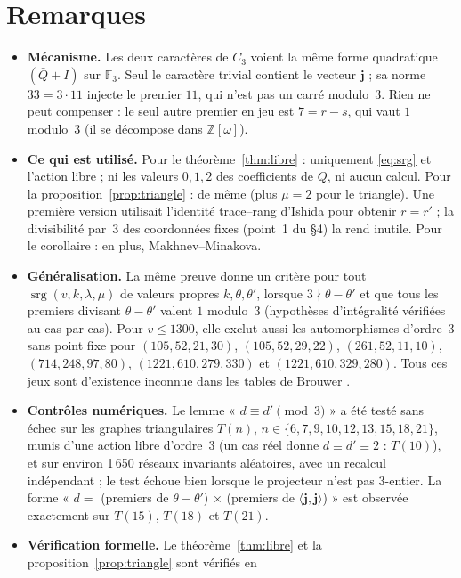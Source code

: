 \documentclass[11pt,a4paper]{article}
\theoremstyle{remark}
\newcommand{\Z}{\mathbb{Z}}
\newcommand{\F}{\mathbb{F}}
\newcommand{\one}{\mathbf{j}}
\newcommand{\srg}{\operatorname{srg}}
\begin{document}
\section{Remarques}

\begin{itemize}[leftmargin=*]
\item \textbf{Mécanisme.} Les deux caractères de $C_3$ voient la même forme quadratique $(\bar Q+I)$ sur $\F_3$. Seul le
caractère trivial contient le vecteur $\one$ ; sa norme $33=3\cdot11$ injecte le premier $11$, qui n'est pas un carré modulo~3.
Rien ne peut compenser : le seul autre premier en jeu est $7=r-s$, qui vaut $1$ modulo~3 (il se décompose dans $\Z[\omega]$).
\item \textbf{Ce qui est utilisé.} Pour le théorème~\ref{thm:libre} : uniquement \eqref{eq:srg} et l'action libre ; ni les valeurs
$0,1,2$ des coefficients de $Q$, ni aucun calcul. Pour la proposition~\ref{prop:triangle} : de même (plus $\mu=2$ pour le
triangle). Une première version utilisait l'identité trace--rang d'Ishida pour obtenir $r=r'$ ; la divisibilité par~3 des
coordonnées fixes (point~1 du §4) la rend inutile. Pour le corollaire : en plus, Makhnev--Minakova.
\item \textbf{Généralisation.} La même preuve donne un critère pour tout $\srg(v,k,\lambda,\mu)$ de valeurs propres $k,\theta,\theta'$,
lorsque $3\nmid\theta-\theta'$ et que tous les premiers divisant $\theta-\theta'$ valent $1$ modulo~3 (hypothèses d'intégralité
vérifiées au cas par cas). Pour $v\le1300$, elle exclut
aussi les automorphismes d'ordre~3 sans point fixe pour $(105,52,21,30)$, $(105,52,29,22)$, $(261,52,11,10)$, $(714,248,97,80)$,
$(1221,610,279,330)$ et $(1221,610,329,280)$. Tous ces jeux sont d'existence inconnue dans les tables de Brouwer \cite{Br}.
\item \textbf{Contrôles numériques.} Le lemme « $d\equiv d'\pmod3$ » a été testé sans échec sur les graphes triangulaires
$T(n)$, $n\in\{6,7,9,10,12,13,15,18,21\}$, munis d'une action libre d'ordre~3 (un cas réel donne $d\equiv d'\equiv2$ : $T(10)$),
et sur environ 1\,650 réseaux invariants aléatoires, avec un recalcul indépendant ; le test échoue bien lorsque le projecteur
n'est pas 3-entier. La forme « $d=$ (premiers de $\theta-\theta'$) $\times$ (premiers de $\langle\one,\one\rangle$) » est
observée exactement sur $T(15)$, $T(18)$ et $T(21)$.
\item \textbf{Vérification formelle.} Le théorème~\ref{thm:libre} et la proposition~\ref{prop:triangle} sont vérifiés en

\end{itemize}
\end{document}
